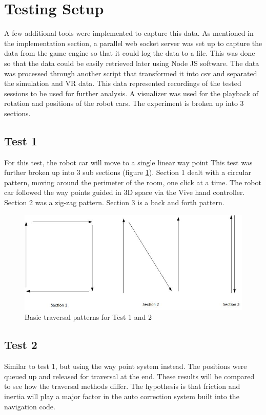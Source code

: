 \documentclass[10pt,a4paper]{article}
\begin{document}
	\section*{Testing Setup}
	A few additional tools were implemented to capture this data. As mentioned in the implementation section, a parallel web socket server was set up to capture the data from the game engine so that it could log the data to a file. This was done so that the data could be easily retrieved later using Node JS software. The data was processed through another script that transformed it into csv and separated the simulation and VR data. This data represented recordings of the tested sessions to be used for further analysis. A visualizer was used for the playback of rotation and positions of the robot cars. The experiment is broken up into 3 sections.
	
	\subsection*{Test 1}
	For this test, the robot car will move to a single linear way point This test was further broken up into 3 sub sections (figure \ref{fig:traversal_patterns}). Section 1 dealt with a circular pattern, moving around the perimeter of the room, one click at a time. The robot car followed the way points guided in 3D space via the Vive hand controller. Section 2 was a zig-zag pattern. Section 3 is a back and forth pattern.
		
	\begin{figure}
		\centering
		\includegraphics[width=.6\textwidth]{basic_traversal.jpg}
		\caption{Basic traversal patterns for Test 1 and 2}
		\label{fig:traversal_patterns}
	\end{figure}

	\subsection*{Test 2}
	Similar to test 1, but using the way point system instead. The positions were queued up and released for traversal at the end. These results will be compared to see how the traversal methods differ. The hypothesis is that friction and inertia will play a major factor in the auto correction system built into the navigation code.
	
\end{document}
